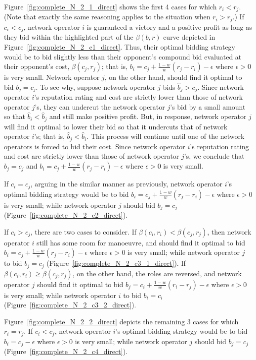 Figure~\ref{fig:complete_N_2_1_direct} shows the first 4 cases for which $r_i < r_j$. (Note that exactly the same reasoning applies to the situation when $r_i > r_j$.) If $c_i < c_j$, network operator $i$ is guaranteed a victory and a positive profit as long as they bid within the highlighted part of the $\beta(b,r)$ curve depicted in Figure~\ref{fig:complete_N_2_c1_direct}. Thus, their optimal bidding strategy would be to bid slightly less than their opponent's compound bid evaluated at their opponent's cost, $\beta(c_j,r_j)$; that is, $b_i = c_j + \frac{1-w}{w}(r_j-r_i) - \epsilon$ where $\epsilon>0$ is very small. Network operator $j$, on the other hand, should find it optimal to bid $b_j = c_j$. To see why, suppose network operator $j$ bids $\hat{b}_j>c_j$. Since network operator $i$'s reputation rating and cost are strictly lower than those of network operator $j$'s, they can undercut the network operator $j$'s bid by a small amount so that $\hat{b}_i < \hat{b}_j$ and still make positive profit. But, in response, network operator $j$ will find it optimal to lower their bid so that it undercuts that of network operator $i$'s; that is, $\hat{b}_j < \hat{b}_i$. This process will continue until one of the network operators is forced to bid their cost. Since network operator $i$'s reputation rating and cost are strictly lower than those of network operator $j$'s, we conclude that $b_j = c_j$ and $b_i = c_j + \frac{1-w}{w}(r_j-r_i) - \epsilon$ where $\epsilon>0$ is very small.

If $c_i = c_j$, arguing in the similar manner as previously, network operator $i$'s optimal bidding strategy would be to bid $b_i = c_j + \frac{1-w}{w}(r_j-r_i) - \epsilon$ where $\epsilon>0$ is very small; while network operator $j$ should bid $b_j = c_j$ (Figure~\ref{fig:complete_N_2_c2_direct}).

If $c_i > c_j$, there are two cases to consider. If $\beta(c_i,r_i)<\beta(c_j,r_j)$, then network operator $i$ still has some room for manoeuvre, and should find it optimal to bid $b_i = c_j + \frac{1-w}{w}(r_j-r_i) - \epsilon$ where $\epsilon>0$ is very small; while network operator $j$ to bid $b_j=c_j$ (Figure~\ref{fig:complete_N_2_c3_1_direct}). If $\beta(c_i,r_i)\ge \beta(c_j,r_j)$, on the other hand, the roles are reversed, and network operator $j$ should find it optimal to bid $b_j = c_i + \frac{1-w}{w}(r_i-r_j) - \epsilon$ where $\epsilon>0$ is very small; while network operator $i$ to bid $b_i = c_i$ (Figure~\ref{fig:complete_N_2_c3_2_direct}).

Figure~\ref{fig:complete_N_2_2_direct} depicts the remaining 3 cases for which $r_i=r_j$. If $c_i < c_j$, network operator $i$'s optimal bidding strategy would be to bid $b_i = c_j - \epsilon$ where $\epsilon>0$ is very small; while network operator $j$ should bid $b_j = c_j$ (Figure~\ref{fig:complete_N_2_c4_direct}).


